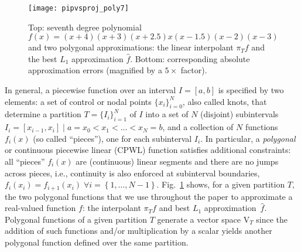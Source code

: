 \documentclass[a4paper,english]{IEEEtran}
\begin{document}
\begin{figure}
\begin{centering}
\texttt{[image: pipvsproj\_poly7]}
\par\end{centering}

\caption{\label{fig:pipvsproj}Top: seventh degree polynomial ${f}(x)=(x+4)(x+3)(x+2.5)x(x-1.5)(x-2)(x-3)$
and two polygonal approximations: the linear interpolant ${\pi_{T}}{f}$
and the best ${L_{1}}$ approximation ${\hat{f}}$. Bottom: corresponding
absolute approximation errors (magnified by a $5\times$ factor).}

\end{figure}
\label{sec:DefPiecewiseFunction}In general, a piecewise function
over an interval $I=[a,b]$ is specified by two elements: a set of
control or nodal points $\{x_{i}\}_{i=0}^{N}$, also called knots,
that determine a partition ${T}=\{I_{i}\}_{i=1}^{N}$ of $I$ into
a set of $N$ (disjoint) subintervals $I_{i}=[x_{i-1},x_{i}]\mid a=x_{0}<x_{1}<\ldots<x_{N}=b$,
and a collection of $N$ functions $f_{i}(x)$ (so called ``pieces''),
one for each subinterval $I_{i}$. In particular, a \emph{polygonal}
or continuous piecewise linear (CPWL) function satisfies additional
constraints: all ``pieces'' $f_{i}(x)$ are (continuous) linear
segments and there are no jumps across pieces, i.e., continuity is
also enforced at subinterval boundaries, $f_{i}(x_{i})=f_{i+1}(x_{i})\;\forall i=\left\{ 1,\ldots,N-1\right\} $.
Fig.~\ref{fig:pipvsproj} shows, for a given partition $T,$ the
two polygonal functions that we use throughout the paper to approximate
a real-valued function $f$: the interpolant ${\pi_{T}} f$ and best ${L_{1}}$
approximation~${\hat{f}}$. Polygonal functions of a given partition
${T}$ generate a vector space ${\mathrm{V}_{T}}$ since the addition of
such functions and/or multiplication by a scalar yields another polygonal
function defined over the same partition. 
\end{document}
